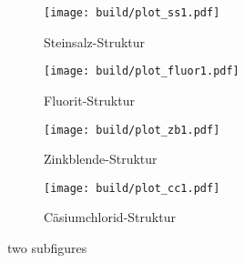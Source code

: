 \begin{figure}[hhh]
  \centering
  \begin{subfigure}{.45\textwidth}
    \centering
    \texttt{[image: build/plot\_ss1.pdf]}
    \caption{Steinsalz-Struktur}
    \label{subfig:ss1}
  \end{subfigure}
  \begin{subfigure}{.45\textwidth}
    \centering
    \texttt{[image: build/plot\_fluor1.pdf]}
    \caption{Fluorit-Struktur}
    \label{subfig:fluo1}
  \end{subfigure}
  \begin{subfigure}{.45\textwidth}
    \centering
    \texttt{[image: build/plot\_zb1.pdf]}
    \caption{Zinkblende-Struktur}
    \label{subfig:zb1}
  \end{subfigure}
  \begin{subfigure}{.45\textwidth}
    \centering
    \texttt{[image: build/plot\_cc1.pdf]}
    \caption{Cäsiumchlorid-Struktur}
    \label{subfig:cc1}
  \end{subfigure}
  \caption{two subfigures}
  \label{fig:salz1}
\end{figure}

